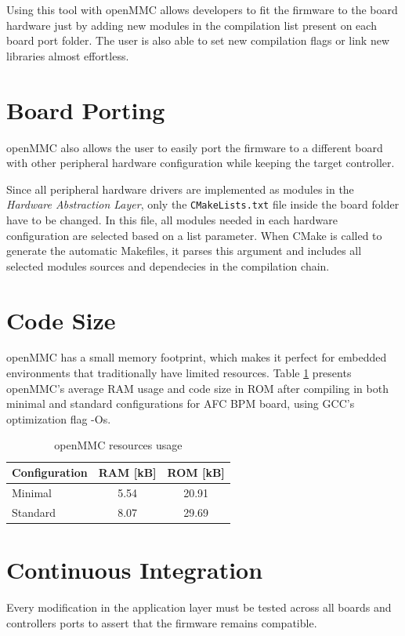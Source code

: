 \documentclass[a4paper,
              ]{jacow}
\begin{document}
Using this tool with openMMC allows developers to fit the firmware to the board hardware just by adding new modules in the compilation list present on each board port folder.
The user is also able to set new compilation flags or link new libraries almost effortless.

\section{Board Porting}
openMMC also allows the user to easily port the firmware to a different board with other peripheral hardware configuration while keeping the target controller.

Since all peripheral hardware drivers are implemented as modules in the \emph{Hardware Abstraction Layer}, only the \texttt{CMakeLists.txt} file inside the board folder have to be changed. In this file, all modules needed in each hardware configuration are selected based on a list parameter. When CMake is called to generate the automatic Makefiles, it parses this argument and includes all selected modules sources and dependecies in the compilation chain.

\section{Code Size}
openMMC has a small memory footprint, which makes it perfect for embedded environments that traditionally have limited resources.
Table \ref{table:mem_usage} presents openMMC's average RAM usage and code size in ROM after compiling in both minimal and standard configurations for AFC BPM board, using GCC's optimization flag -Os.

\begin{table}[hbt]
  \centering
  \caption{openMMC resources usage}
  \label{table:mem_usage}
  \begin{tabular}{lcc}
    \toprule
    \textbf{Configuration} & \textbf{RAM [kB]} & \textbf{ROM [kB]} \\
    \midrule
    Minimal                & 5.54               & 20.91  \\
    Standard               & 8.07               & 29.69  \\
       \bottomrule
  \end{tabular}
\end{table}

\section{Continuous Integration}
Every modification in the application layer must be tested across all boards and controllers ports to assert that the firmware remains compatible.
\end{document}
